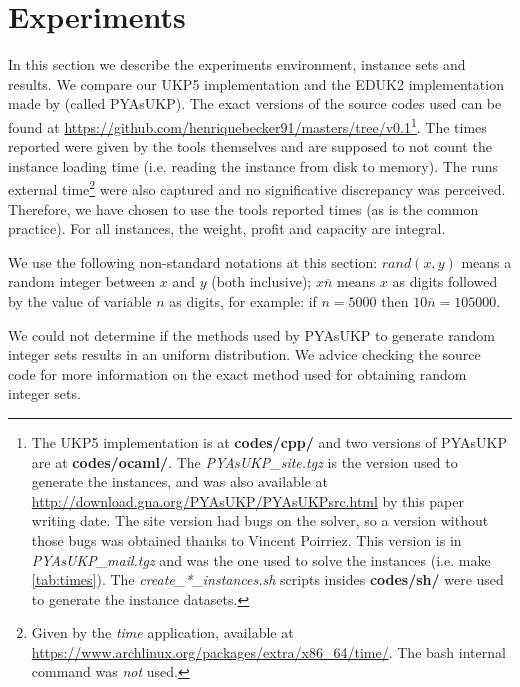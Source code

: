 \documentclass[runningheads,a4paper]{llncs}
\begin{document}
\section{Experiments}
In this section we describe the experiments environment, instance sets and results. We compare our UKP5 implementation and the EDUK2 implementation made by \cite{CPYA} (called PYAsUKP). The exact versions of the source codes used can be found at \url{https://github.com/henriquebecker91/masters/tree/v0.1}\footnote{The UKP5 implementation is at \textbf{codes/cpp/} and two versions of PYAsUKP are at \textbf{codes/ocaml/}. The \emph{PYAsUKP\_site.tgz} is the version used to generate the instances, and was also available at \url{http://download.gna.org/PYAsUKP/PYAsUKPsrc.html} by this paper writing date. The site version had bugs on the solver, so a version without those bugs was obtained thanks to Vincent Poirriez. This version is in \emph{PYAsUKP\_mail.tgz} and was the one used to solve the instances (i.e. make \ref{tab:times}). The \emph{create\_*\_instances.sh} scripts insides \textbf{codes/sh/} were used to generate the instance datasets.}. The times reported were given by the tools themselves and are supposed to not count the instance loading time (i.e. reading the instance from disk to memory). The runs external time\footnote{Given by the \textit{time} application, available at \url{https://www.archlinux.org/packages/extra/x86_64/time/}. The bash internal command was \emph{not} used.} were also captured and no significative discrepancy was perceived. Therefore, we have chosen to use the tools reported times (as is the common practice). For all instances, the weight, profit and capacity are integral.

We use the following non-standard notations at this section: \(rand(x, y)\) means a random integer between \(x\) and \(y\) (both inclusive); \(x\overline{n}\) means \(x\) as digits followed by the value of variable \(n\) as digits, for example: if \(n = 5000\) then \(10\overline{n} = 105000\).

We could not determine if the methods used by PYAsUKP to generate random integer sets results in an uniform distribution. We advice checking the source code for more information on the exact method used for obtaining random integer sets.
\end{document}
